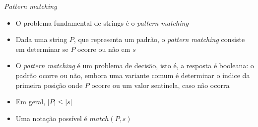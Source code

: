 \begin{frame}[fragile]{\textit{Pattern matching}}

    \begin{itemize}
        \item O problema fundamental de strings é o \textit{pattern matching}
        \pause

        \item Dada uma string $P$, que representa um padrão, o \textit{pattern matching} consiste
            em determinar se $P$ ocorre ou não em $s$
        \pause

        \item O \textit{pattern matching} é um problema de decisão, isto é, a resposta é booleana: 
            o padrão ocorre ou não, embora uma variante comum é determinar o índice da primeira
            posição onde $P$ ocorre ou um valor sentinela, caso não ocorra
        \pause

        \item Em geral, $|P| \leq |s|$
        \pause

        \item Uma notação possível é $match(P, s)$

    \end{itemize}

\end{frame}
